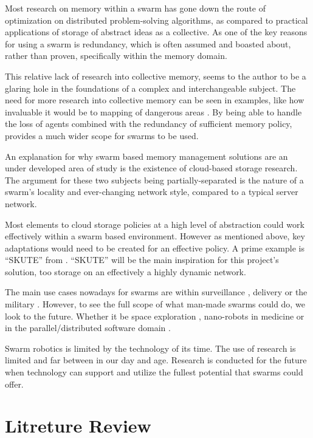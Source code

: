 \documentclass{UoYCSproject}
\begin{document}
Most research on memory within a swarm has gone down the route of optimization on distributed problem-solving algorithms, as compared to practical applications of storage of abstract ideas as a collective.
As one of the key reasons for using a swarm is redundancy, which is often assumed and boasted about, rather than proven, specifically within the memory domain.

This relative lack of research into collective memory, seems to the author to be a glaring hole in the foundations of a complex and interchangeable subject.
The need for more research into collective memory can be seen in examples, like how invaluable it would be to mapping of dangerous areas \cite{Cognitive maps mine detection}.
By being able to handle the loss of agents combined with the redundancy of sufficient memory policy, provides a much wider scope for swarms to be used.

An explanation for why swarm based memory management solutions are an under developed area of study is the existence of cloud-based storage research.
The argument for these two subjects being partially-separated is the nature of a swarm's locality and ever-changing network style, compared to a typical server network.


Most elements to cloud storage policies at a high level of abstraction could work effectively within a swarm based environment.
However as mentioned above, key adaptations would need to be created for an effective policy.
A prime example is “SKUTE” from \cite{Distributed Storage}.
“SKUTE” will be the main inspiration for this project's solution, too storage on an effectively a highly dynamic network.

The main use cases nowadays for swarms are within surveillance \cite{UAV, HiveMind}, delivery or the military \cite{Swarm robotics reviewed}.
However, to see the full scope of what man-made swarms could do, we look to the future.
Whether it be space exploration \cite{Space exploration}, nano-robots in medicine or in the parallel/distributed software domain \cite{blockchainandSwarm}.

Swarm robotics is limited by the technology of its time.
The use of research is limited and far between in our day and age.
Research is conducted for the future when technology can support and utilize the fullest potential that swarms could offer.




\chapter{Litreture Review}
\label{cha:Litreture Review}
\end{document}
